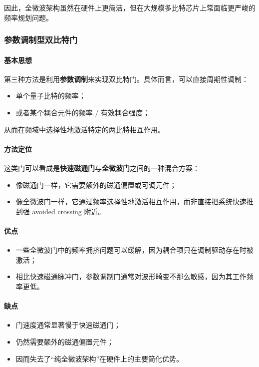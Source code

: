 \documentclass[12pt,a4paper,oneside]{ctexbook}
\begin{document}
因此，全微波架构虽然在硬件上更简洁，但在大规模多比特芯片上常面临更严峻的频率规划问题。

\subsubsection{参数调制型双比特门}

\paragraph{基本思想}
第三种方法是利用\textbf{参数调制}来实现双比特门。具体而言，可以直接周期性调制：
\begin{itemize}
    \item 单个量子比特的频率；
    \item 或者某个耦合元件的频率 / 有效耦合强度；
\end{itemize}
从而在频域中选择性地激活特定的两比特相互作用。

\paragraph{方法定位}
这类门可以看成是\textbf{快速磁通门}与\textbf{全微波门}之间的一种混合方案：
\begin{itemize}
    \item 像磁通门一样，它需要额外的磁通偏置或可调元件；
    \item 像全微波门一样，它通过频率选择性地激活相互作用，而非直接把系统快速推到强 avoided crossing 附近。
\end{itemize}

\paragraph{优点}
\begin{itemize}
    \item 一些全微波门中的频率拥挤问题可以缓解，因为耦合项只在调制驱动存在时被激活；
    \item 相比快速磁通脉冲门，参数调制门通常对波形畸变不那么敏感，因为其工作频率更低。
\end{itemize}

\paragraph{缺点}
\begin{itemize}
    \item 门速度通常显著慢于快速磁通门；
    \item 仍然需要额外的磁通偏置元件；
    \item 因而失去了“纯全微波架构”在硬件上的主要简化优势。
\end{itemize}
\end{document}
